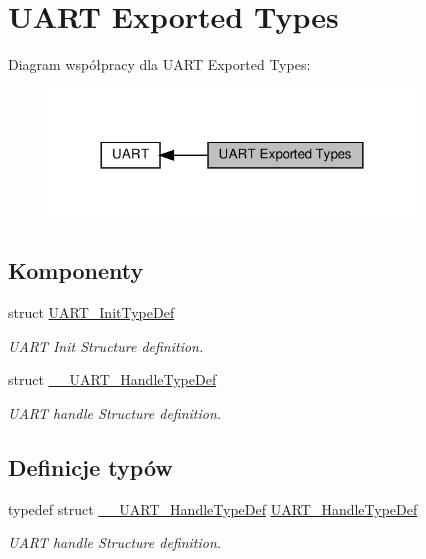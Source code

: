 \hypertarget{group___u_a_r_t___exported___types}{}\section{U\+A\+RT Exported Types}
\label{group___u_a_r_t___exported___types}
Diagram współpracy dla U\+A\+RT Exported Types\+:\nopagebreak
\begin{figure}[H]
\begin{center}
\leavevmode
\includegraphics[width=276pt]{group___u_a_r_t___exported___types}
\end{center}
\end{figure}
\subsection*{Komponenty}
\begin{DoxyCompactItemize}
\item 
struct \hyperlink{struct_u_a_r_t___init_type_def}{U\+A\+R\+T\+\_\+\+Init\+Type\+Def}
\begin{DoxyCompactList}\small\item\em U\+A\+RT Init Structure definition. \end{DoxyCompactList}\item 
struct \hyperlink{struct_____u_a_r_t___handle_type_def}{\+\_\+\+\_\+\+U\+A\+R\+T\+\_\+\+Handle\+Type\+Def}
\begin{DoxyCompactList}\small\item\em U\+A\+RT handle Structure definition. \end{DoxyCompactList}\end{DoxyCompactItemize}
\subsection*{Definicje typów}
\begin{DoxyCompactItemize}
\item 
typedef struct \hyperlink{struct_____u_a_r_t___handle_type_def}{\+\_\+\+\_\+\+U\+A\+R\+T\+\_\+\+Handle\+Type\+Def} \hyperlink{group___u_a_r_t___exported___types_ga7adf4f3e4c3ecde572be5925c915a967}{U\+A\+R\+T\+\_\+\+Handle\+Type\+Def}
\begin{DoxyCompactList}\small\item\em U\+A\+RT handle Structure definition. \end{DoxyCompactList}\end{DoxyCompactItemize}
